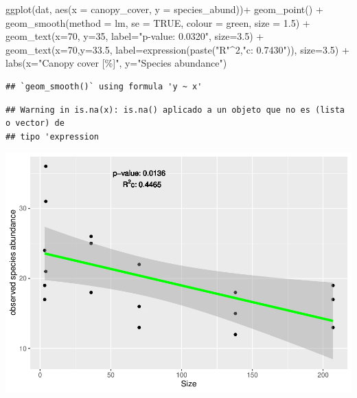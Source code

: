 \documentclass[
]{article}
\newenvironment{Shaded}{\begin{snugshade}}{\end{snugshade}}
\newcommand{\AttributeTok}[1]{\textcolor[rgb]{0.77,0.63,0.00}{#1}}
\newcommand{\ConstantTok}[1]{\textcolor[rgb]{0.00,0.00,0.00}{#1}}
\newcommand{\DecValTok}[1]{\textcolor[rgb]{0.00,0.00,0.81}{#1}}
\newcommand{\FloatTok}[1]{\textcolor[rgb]{0.00,0.00,0.81}{#1}}
\newcommand{\FunctionTok}[1]{\textcolor[rgb]{0.00,0.00,0.00}{#1}}
\newcommand{\NormalTok}[1]{#1}
\newcommand{\SpecialCharTok}[1]{\textcolor[rgb]{0.00,0.00,0.00}{#1}}
\newcommand{\StringTok}[1]{\textcolor[rgb]{0.31,0.60,0.02}{#1}}
\begin{document}
\begin{Shaded}
\begin{Highlighting}[]
\FunctionTok{ggplot}\NormalTok{(dat, }\FunctionTok{aes}\NormalTok{(}\AttributeTok{x =}\NormalTok{ canopy\_cover, }\AttributeTok{y =}\NormalTok{ species\_abund))}\SpecialCharTok{+}
  \FunctionTok{geom\_point}\NormalTok{() }\SpecialCharTok{+}
  \FunctionTok{geom\_smooth}\NormalTok{(}\AttributeTok{method =}\NormalTok{ lm, }\AttributeTok{se =} \ConstantTok{TRUE}\NormalTok{, }\AttributeTok{colour =} \StringTok{\textquotesingle{}green\textquotesingle{}}\NormalTok{, }\AttributeTok{size =} \FloatTok{1.5}\NormalTok{) }\SpecialCharTok{+}
  \FunctionTok{geom\_text}\NormalTok{(}\AttributeTok{x=}\DecValTok{70}\NormalTok{, }\AttributeTok{y=}\DecValTok{35}\NormalTok{, }\AttributeTok{label=}\StringTok{"p{-}value: 0.0320"}\NormalTok{, }\AttributeTok{size=}\FloatTok{3.5}\NormalTok{) }\SpecialCharTok{+}
  \FunctionTok{geom\_text}\NormalTok{(}\AttributeTok{x=}\DecValTok{70}\NormalTok{,}\AttributeTok{y=}\FloatTok{33.5}\NormalTok{, }\AttributeTok{label=}\FunctionTok{expression}\NormalTok{(}\FunctionTok{paste}\NormalTok{(}\StringTok{"R"}\SpecialCharTok{\^{}}\DecValTok{2}\NormalTok{,}\StringTok{"c: 0.7430"}\NormalTok{)), }\AttributeTok{size=}\FloatTok{3.5}\NormalTok{) }\SpecialCharTok{+}
  \FunctionTok{labs}\NormalTok{(}\AttributeTok{x=}\StringTok{"Canopy cover [\%]"}\NormalTok{, }\AttributeTok{y=}\StringTok{"Species abundance"}\NormalTok{)}
\end{Highlighting}
\end{Shaded}

\begin{verbatim}
## `geom_smooth()` using formula 'y ~ x'
\end{verbatim}

\begin{verbatim}
## Warning in is.na(x): is.na() aplicado a un objeto que no es (lista o vector) de
## tipo 'expression
\end{verbatim}

\includegraphics{birdsdataanalysis_files/figure-latex/unnamed-chunk-10-1.pdf}
\end{document}
